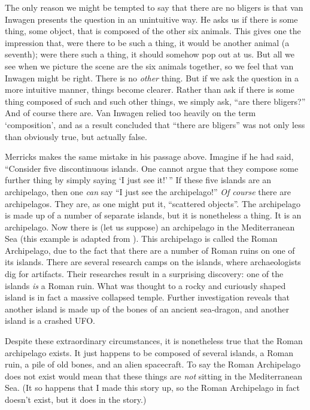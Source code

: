 \documentclass[11pt]{article}
\begin{document}
\begin{spacing}{1.25}
The only reason we might be tempted to say that there are no bligers
is that van Inwagen presents the question in an unintuitive way.  He
asks us if there is some thing, some object, that is composed of the
other six animals.  This gives one the impression that, were there to
be such a thing, it would be another animal (a seventh); were there
such a thing, it should somehow pop out at us.  But all we see when we
picture the scene are the six animals together, so we feel that van
Inwagen might be right.  There is no {\em other} thing.  But if we ask
the question in a more intuitive manner, things become clearer.
Rather than ask if there is some thing composed of such and such other
things, we simply ask, ``are there bligers?''  And of course there
are.  Van Inwagen relied too heavily on the term `composition', and as
a result concluded that ``there are bligers'' was not only less than
obviously true, but actually false.

Merricks makes the same mistake in his passage above.  Imagine if he
had said, ``Consider five discontinuous islands.  One cannot argue
that they compose some further thing by simply saying `I just see
it!'\,'' If these five islands are an archipelago, then one {\em can}
say ``I just see the archipelago!''  {\em Of course} there are
archipelagos.  They are, as one might put it, ``scattered objects''.
The archipelago is made up of a number of separate islands, but it is
nonetheless a thing.  It is an archipelago.  Now there is (let us
suppose) an archipelago in the Mediterranean Sea (this example is
adapted from \citeyearpar{hawthorne2008}).  This archipelago is called
the Roman Archipelago, due to the fact that there are a number of
Roman ruins on one of its islands.  There are several research camps
on the islands, where archaeologists dig for artifacts.  Their
researches result in a surprising discovery: one of the islands {\em
  is} a Roman ruin.  What was thought to a rocky and curiously shaped
island is in fact a massive collapsed temple.  Further investigation
reveals that another island is made up of the bones of an ancient
sea-dragon, and another island is a crashed UFO.

Despite these extraordinary circumstances, it is nonetheless true that
the Roman archipelago exists.  It just happens to be composed of
several islands, a Roman ruin, a pile of old bones, and an alien
spacecraft.  To say the Roman Archipelago does not exist would mean
that these things are {\em not} sitting in the Mediterranean Sea.  (It
so happens that I made this story up, so the Roman Archipelago in fact
doesn't exist, but it does in the story.)


\end{spacing}
\end{document}
